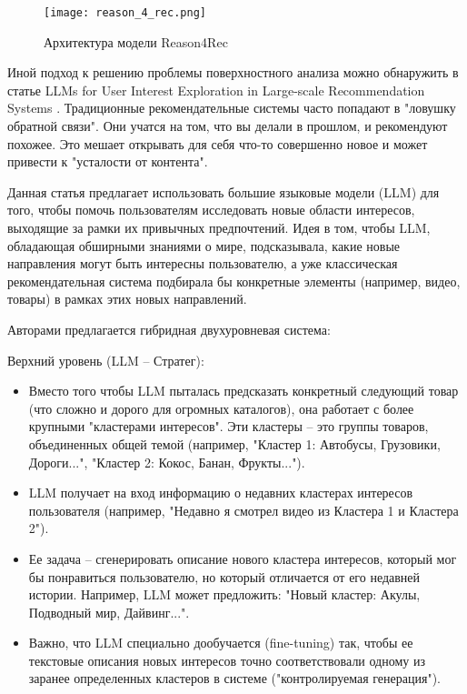 \begin{figure}[H]
    \centering
    \texttt{[image: reason\_4\_rec.png]}
    \caption{Архитектура модели Reason4Rec}
    \label{fig:reason4rec}
\end{figure}

Иной подход к решению проблемы поверхностного анализа можно обнаружить в статье LLMs for User Interest Exploration in Large-scale Recommendation Systems \citep{wang2024llms}. Традиционные рекомендательные системы часто попадают в "ловушку обратной связи". Они учатся на том, что вы делали в прошлом, и рекомендуют похожее. Это мешает открывать для себя что-то совершенно новое и может привести к "усталости от контента".

Данная статья предлагает использовать большие языковые модели (LLM) для того, чтобы помочь пользователям исследовать новые области интересов, выходящие за рамки их привычных предпочтений. Идея в том, чтобы LLM, обладающая обширными знаниями о мире, подсказывала, какие новые направления могут быть интересны пользователю, а уже классическая рекомендательная система подбирала бы конкретные элементы (например, видео, товары) в рамках этих новых направлений.

Авторами предлагается гибридная двухуровневая система:

Верхний уровень (LLM – Стратег):
\begin{itemize}
    \item Вместо того чтобы LLM пыталась предсказать конкретный следующий товар (что сложно и дорого для огромных каталогов), она работает с более крупными "кластерами интересов". Эти кластеры – это группы товаров, объединенных общей темой (например, "Кластер 1: Автобусы, Грузовики, Дороги...", "Кластер 2: Кокос, Банан, Фрукты...").
    \item LLM получает на вход информацию о недавних кластерах интересов пользователя (например, "Недавно я смотрел видео из Кластера 1 и Кластера 2").
    \item Ее задача – сгенерировать описание нового кластера интересов, который мог бы понравиться пользователю, но который отличается от его недавней истории. Например, LLM может предложить: "Новый кластер: Акулы, Подводный мир, Дайвинг...".
    \item Важно, что LLM специально дообучается (fine-tuning) так, чтобы ее текстовые описания новых интересов точно соответствовали одному из заранее определенных кластеров в системе ("контролируемая генерация").
\end{itemize}

